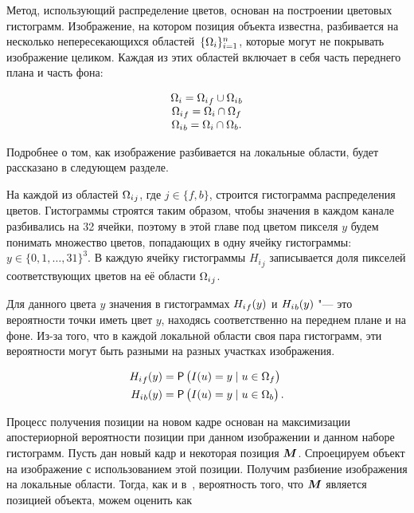 Метод, использующий распределение цветов, основан на построении цветовых
гистограмм.
Изображение, на котором позиция объекта известна, разбивается на несколько
непересекающихся областей~$\{\Omega_i\}_{i = 1}^n$, которые могут не покрывать
изображение целиком.
Каждая из этих областей включает в себя часть переднего плана и часть фона:

\begin{equation}
\label{eqn:histo_partitioning}
\begin{array}{c}
\Omega_i = {\Omega_i}_f \cup {\Omega_i}_b \\
{\Omega_i}_f = \Omega_i \cap \Omega_f \\
{\Omega_i}_b = \Omega_i \cap \Omega_b
\text{.}
\end{array}
\end{equation}

Подробнее о том, как изображение разбивается на локальные области, будет
рассказано в следующем разделе.

На каждой из областей ${\Omega_i}_j$, где $j \in \{ f, b\}$, строится
гистограмма распределения цветов.
Гистограммы строятся таким образом, чтобы значения в каждом канале разбивались
на 32 ячейки, поэтому в этой главе под цветом пикселя $y$ будем понимать
множество цветов, попадающих в одну ячейку гистограммы:
$y \in \{0, 1, \dots, 31\}^3$.
В каждую ячейку гистограммы ${H_i}_j$ записывается доля пикселей
соответствующих
цветов на её области ${\Omega_i}_j$.

Для данного цвета $y$ значения в гистограммах ${H_i}_f(y)$ и
${H_i}_b(y)$ "--- это вероятности точки иметь цвет $y$, находясь
соответственно на переднем плане и на фоне.
Из-за того, что в каждой локальной области своя пара гистограмм, эти
вероятности могут быть разными на разных участках изображения.

\begin{align}
\label{eqn:H_f_Y}
    {\ensuremath{H_i}}_f(y) &= \mathsf{P} \left( I(\mathnormal{u}) = y \mid \mathnormal{u} \in \Omega_f \right) \\
    {H_i}_b(y) &= \mathsf{P} \left( I(\mathnormal{u}) = y \mid \mathnormal{u} \in \Omega_b \right)
\text{.}
\end{align}

Процесс получения позиции на новом кадре основан на максимизации апостериорной
вероятности позиции при данном изображении и данном наборе гистограмм.
Пусть дан новый кадр и некоторая позиция $\bm{M}$.
Спроецируем объект на изображение с использованием этой позиции.
Получим разбиение изображения на локальные области.
Тогда, как и в~\cite{Hexner2016}, вероятность того, что $\bm{M}$ является
позицией
объекта, можем оценить как

